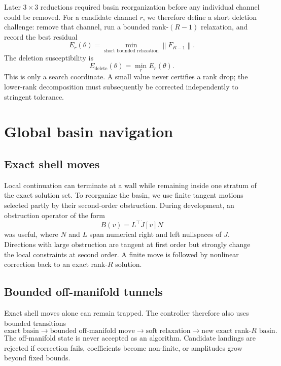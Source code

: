 \documentclass[11pt]{article}
\newcommand{\norm}[1]{\left\lVert #1 \right\rVert}
\begin{document}
Later $3\times3$ reductions required basin reorganization before any individual channel could be removed.  For a candidate channel $r$, we therefore define a short deletion challenge: remove that channel, run a bounded rank-$(R-1)$ relaxation, and record the best residual
\begin{equation}
E_r(\theta)
=
\min_{\text{short bounded relaxation}}
\norm{F_{R-1}}.
\end{equation}
The deletion susceptibility is
\begin{equation}
E_{\mathrm{delete}}(\theta)=\min_r E_r(\theta).
\end{equation}
This is only a search coordinate.  A small value never certifies a rank drop; the lower-rank decomposition must subsequently be corrected independently to stringent tolerance.

\section{Global basin navigation}

\subsection{Exact shell moves}

Local continuation can terminate at a wall while remaining inside one stratum of the exact solution set.  To reorganize the basin, we use finite tangent motions selected partly by their second-order obstruction.  During development, an obstruction operator of the form
\begin{equation}
B(v)=L^\top \dot J[v]N
\end{equation}
was useful, where $N$ and $L$ span numerical right and left nullspaces of $J$.  Directions with large obstruction are tangent at first order but strongly change the local constraints at second order.  A finite move is followed by nonlinear correction back to an exact rank-$R$ solution.

\subsection{Bounded off-manifold tunnels}

Exact shell moves alone can remain trapped.  The controller therefore also uses bounded transitions
\begin{equation}
\text{exact basin}
\longrightarrow
\text{bounded off-manifold move}
\longrightarrow
\text{soft relaxation}
\longrightarrow
\text{new exact rank-}R\text{ basin}.
\end{equation}
The off-manifold state is never accepted as an algorithm.  Candidate landings are rejected if correction fails, coefficients become non-finite, or amplitudes grow beyond fixed bounds.
\end{document}
